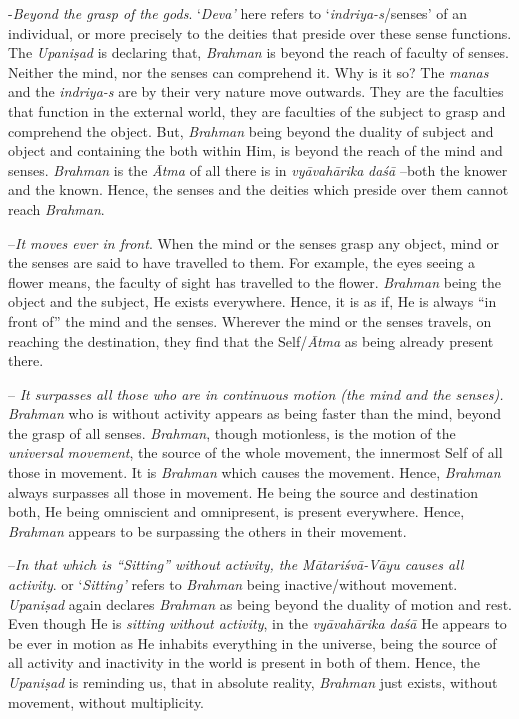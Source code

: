  -\emph{Beyond the grasp of the gods}. `\emph{Deva'} here refers to `\emph{indriya-s}/senses' of an individual, or more precisely to the deities that preside over these sense functions. The \emph{Upaniṣad} is declaring that, \emph{Brahman} is beyond the reach of faculty of senses. Neither the mind, nor the senses can comprehend it. Why is it so? The \emph{manas} and the \emph{indriya-s} are by their very nature move outwards. They are the faculties that function in the external world, they are faculties of the subject to grasp and comprehend the object. But, \emph{Brahman} being beyond the duality of subject and object and containing the both within Him, is beyond the reach of the mind and senses. \emph{Brahman} is the \emph{Ātma} of all there is in \emph{vyāvahārika} \emph{daśā} --both the knower and the known. Hence, the senses and the deities which preside over them cannot reach \emph{Brahman}.

 --\emph{It moves ever in front}. When the mind or the senses grasp any object, mind or the senses are said to have travelled to them. For example, the eyes seeing a flower means, the faculty of sight has travelled to the flower. \emph{Brahman} being the object and the subject, He exists everywhere. Hence, it is as if, He is always ``in front of'' the mind and the senses. Wherever the mind or the senses travels, on reaching the destination, they find that the Self/\emph{Ātma} as being already present there.

 -- \emph{It surpasses all those who are in continuous motion (the mind and the senses).} \emph{Brahman} who is without activity appears as being faster than the mind, beyond the grasp of all senses. \emph{Brahman}, though motionless, is the motion of the \emph{universal} \emph{movement}, the source of the whole movement, the innermost Self of all those in movement. It is \emph{Brahman} which causes the movement. Hence, \emph{Brahman} always surpasses all those in movement. He being the source and destination both, He being omniscient and omnipresent, is present everywhere. Hence, \emph{Brahman} appears to be surpassing the others in their movement.

 --\emph{In that which is ``Sitting'' without activity, the Mātariśvā-Vāyu causes all activity}.  or `\emph{Sitting'} refers to \emph{Brahman} being inactive/without movement. \emph{Upaniṣad} again declares \emph{Brahman} as being beyond the duality of motion and rest. Even though He is \emph{sitting without activity}, in the \emph{vyāvahārika} \emph{daśā} He appears to be ever in motion as He inhabits everything in the universe, being the source of all activity and inactivity in the world is present in both of them. Hence, the \emph{Upaniṣad} is reminding us, that in absolute reality, \emph{Brahman} just exists, without movement, without multiplicity.

